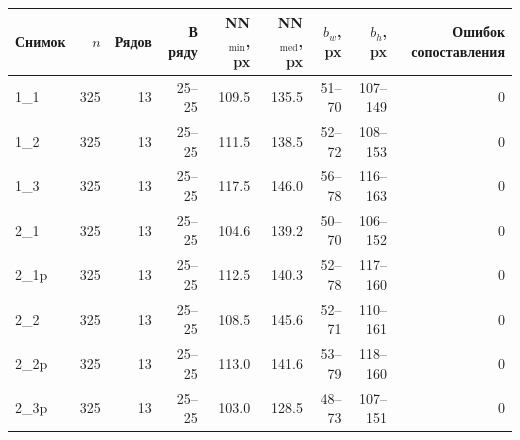 \begin{tabular}{@{}lrrrrrrrr@{}}
\toprule
Снимок & $n$ & Рядов & В ряду & NN$_{\min}$, px & NN$_{\text{med}}$, px &
$b_w$, px & $b_h$, px & Ошибок сопоставления \\
\midrule
1\_1 & 325 & 13 & 25--25 & \num{109.5} & \num{135.5} & 51--70 & 107--149 & 0 \\
1\_2 & 325 & 13 & 25--25 & \num{111.5} & \num{138.5} & 52--72 & 108--153 & 0 \\
1\_3 & 325 & 13 & 25--25 & \num{117.5} & \num{146.0} & 56--78 & 116--163 & 0 \\
2\_1 & 325 & 13 & 25--25 & \num{104.6} & \num{139.2} & 50--70 & 106--152 & 0 \\
2\_1p & 325 & 13 & 25--25 & \num{112.5} & \num{140.3} & 52--78 & 117--160 & 0 \\
2\_2 & 325 & 13 & 25--25 & \num{108.5} & \num{145.6} & 52--71 & 110--161 & 0 \\
2\_2p & 325 & 13 & 25--25 & \num{113.0} & \num{141.6} & 53--79 & 118--160 & 0 \\
2\_3p & 325 & 13 & 25--25 & \num{103.0} & \num{128.5} & 48--73 & 107--151 & 0 \\
\bottomrule
\end{tabular}
